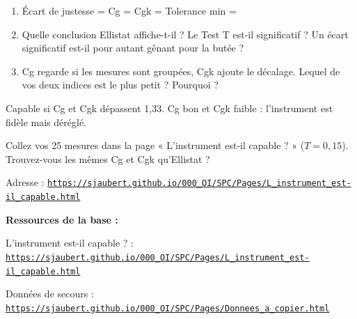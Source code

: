 \documentclass[10pt,a4paper]{article}
\begin{document}
\begin{enumerate}[label=\textcolor{cyan}{\textbf{Q\arabic*.}},leftmargin=22pt]
\item Écart de justesse = \champ{16mm} \quad Cg = \champ{12mm} \quad Cgk = \champ{12mm} \quad Tolerance min = \champ{16mm}\par\vspace{5pt}
\item Quelle conclusion Ellistat affiche-t-il ? Le Test T est-il significatif ? Un écart significatif est-il pour autant gênant pour la butée ?\reponse[1]
\item Cg regarde si les mesures sont groupées, Cgk ajoute le décalage. Lequel de vos deux indices est le plus petit ? Pourquoi ?\reponse[2]
\end{enumerate}
\begin{tcolorbox}[retenir]Capable si Cg et Cgk dépassent 1,33. Cg bon et Cgk faible : l'instrument est fidèle mais déréglé.\end{tcolorbox}
\begin{tcolorbox}[plus]Collez vos 25 mesures dans la page « L'instrument est-il capable ? » ($T = 0{,}15$). Trouvez-vous les mêmes Cg et Cgk qu'Ellistat ?\par Adresse : \href{https://sjaubert.github.io/000_OI/SPC/Pages/L_instrument_est-il_capable.html}{\nolinkurl{https://sjaubert.github.io/000_OI/SPC/Pages/L_instrument_est-il_capable.html}}\end{tcolorbox}
\vfill{\footnotesize\color{uimm}\textbf{Ressources de la base :}\par L'instrument est-il capable ? : \href{https://sjaubert.github.io/000_OI/SPC/Pages/L_instrument_est-il_capable.html}{\nolinkurl{https://sjaubert.github.io/000_OI/SPC/Pages/L_instrument_est-il_capable.html}}\par Données de secours : \href{https://sjaubert.github.io/000_OI/SPC/Pages/Donnees_a_copier.html\#instr}{\nolinkurl{https://sjaubert.github.io/000_OI/SPC/Pages/Donnees_a_copier.html}}}
\end{document}
